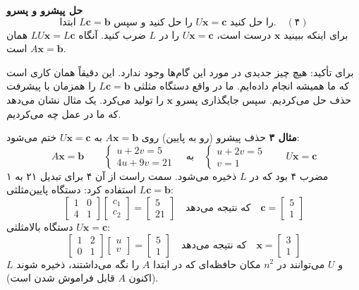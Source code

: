 \documentclass[12pt, a4paper]{book}
\begin{document}
	\textbf{حل پیشرو و پسرو}
	\[ \text{ابتدا } L\mathbf{c}=\mathbf{b} \text{ را حل کنید و سپس } U\mathbf{x}=\mathbf{c} \text{ را حل کنید.} \quad (۴) \]
	برای اینکه ببینید $\mathbf{x}$ درست است، $U\mathbf{x}=\mathbf{c}$ را در $L$ ضرب کنید. آنگاه $LU\mathbf{x} = L\mathbf{c}$ همان $A\mathbf{x}=\mathbf{b}$ است.
	
	برای تأکید: هیچ چیز جدیدی در مورد این گام‌ها وجود ندارد. این دقیقاً همان کاری است که ما همیشه انجام داده‌ایم. ما در واقع دستگاه مثلثی $L\mathbf{c}=\mathbf{b}$ را همزمان با پیشرفت حذف حل می‌کردیم. سپس جایگذاری پسرو $\mathbf{x}$ را تولید می‌کرد. یک مثال نشان می‌دهد که ما در عمل چه می‌کردیم.
	
	\textbf{مثال ۳}
	حذف پیشرو (رو به پایین) روی $A\mathbf{x}=\mathbf{b}$ به $U\mathbf{x}=\mathbf{c}$ ختم می‌شود:
	\[ A\mathbf{x}=\mathbf{b} \qquad \begin{cases} u + 2v = 5 \\ 4u + 9v = 21 \end{cases} \quad \text{به} \quad \begin{cases} u + 2v = 5 \\ v=1 \end{cases} \qquad U\mathbf{x}=\mathbf{c} \]
	مضرب ۴ بود که در $L$ ذخیره می‌شود. سمت راست از آن ۴ برای تبدیل ۲۱ به ۱ استفاده کرد:
	دستگاه پایین‌مثلثی $L\mathbf{c}=\mathbf{b}$:
	\[ \begin{bmatrix} 1 & 0 \\ 4 & 1 \end{bmatrix} \begin{bmatrix} c_1 \\ c_2 \end{bmatrix} = \begin{bmatrix} 5 \\ 21 \end{bmatrix} \quad \text{که نتیجه می‌دهد} \quad \mathbf{c} = \begin{bmatrix} 5 \\ 1 \end{bmatrix} \]
	دستگاه بالامثلثی $U\mathbf{x}=\mathbf{c}$:
	\[ \begin{bmatrix} 1 & 2 \\ 0 & 1 \end{bmatrix} \begin{bmatrix} u \\ v \end{bmatrix} = \begin{bmatrix} 5 \\ 1 \end{bmatrix} \quad \text{که نتیجه می‌دهد} \quad \mathbf{x} = \begin{bmatrix} 3 \\ 1 \end{bmatrix} \]
	$L$ و $U$ می‌توانند در $n^2$ مکان حافظه‌ای که در ابتدا $A$ را نگه می‌داشتند، ذخیره شوند (اکنون $A$ قابل فراموش شدن است).
	
\end{document}
